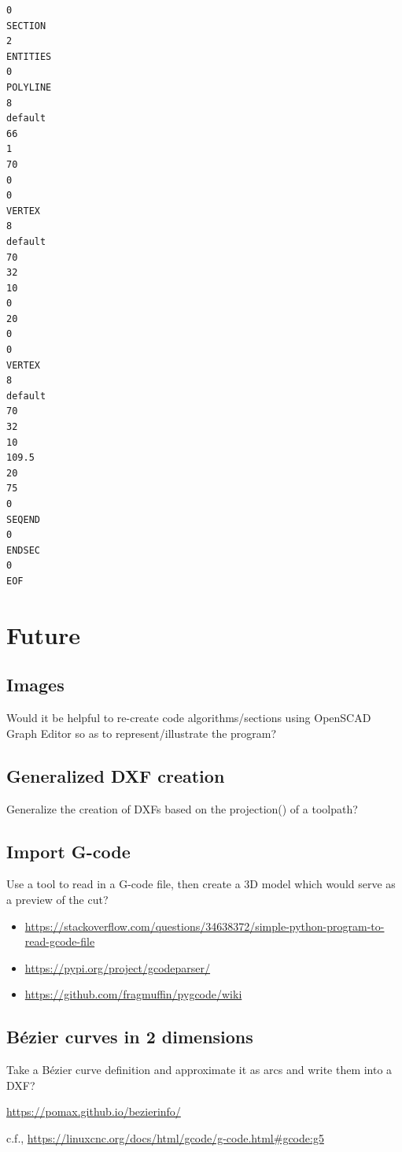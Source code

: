 \documentclass{ltxdoc}
\begin{document}
\begin{verbatim}
0
SECTION
2
ENTITIES
0
POLYLINE
8
default
66
1
70
0
0
VERTEX
8
default
70
32
10
0
20
0
0
VERTEX
8
default
70
32
10
109.5
20
75
0
SEQEND
0
ENDSEC
0
EOF
\end{verbatim}

\section{Future}

\subsection{Images}

Would it be helpful to re-create code algorithms/sections using OpenSCAD Graph Editor 
so as to represent/illustrate the program?

\subsection{Generalized DXF creation}

Generalize the creation of DXFs based on the projection() of a toolpath?

\subsection{Import G-code}

Use a tool to read in a G-code file, then create a 3D model which would serve as a preview of the cut?

\begin{itemize}
\item \url{https://stackoverflow.com/questions/34638372/simple-python-program-to-read-gcode-file}
\item \url{https://pypi.org/project/gcodeparser/}
\item \url{https://github.com/fragmuffin/pygcode/wiki}
\end{itemize} 
 
\subsection{Bézier curves in 2 dimensions}

Take a Bézier curve definition and approximate it as arcs and write them into a DXF?

\url{https://pomax.github.io/bezierinfo/}

c.f., \url{https://linuxcnc.org/docs/html/gcode/g-code.html#gcode:g5}
\end{document}
